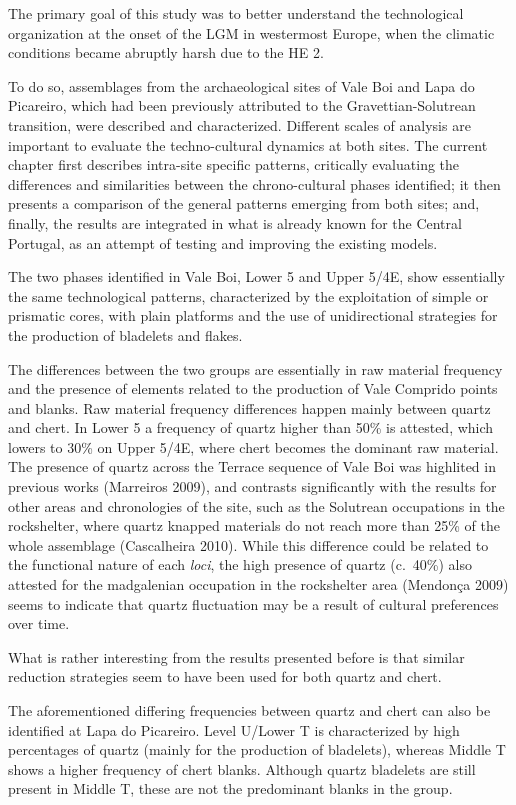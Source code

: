 \documentclass[12pt,twoside]{reedthesis}
\begin{document}
The primary goal of this study was to better understand the technological organization at the onset of the LGM in westermost Europe, when the climatic conditions became abruptly harsh due to the HE 2.

To do so, assemblages from the archaeological sites of Vale Boi and Lapa do Picareiro, which had been previously attributed to the Gravettian-Solutrean transition, were described and characterized. Different scales of analysis are important to evaluate the techno-cultural dynamics at both sites. The current chapter first describes intra-site specific patterns, critically evaluating the differences and similarities between the chrono-cultural phases identified; it then presents a comparison of the general patterns emerging from both sites; and, finally, the results are integrated in what is already known for the Central Portugal, as an attempt of testing and improving the existing models.

The two phases identified in Vale Boi, Lower 5 and Upper 5/4E, show essentially the same technological patterns, characterized by the exploitation of simple or prismatic cores, with plain platforms and the use of unidirectional strategies for the production of bladelets and flakes.

The differences between the two groups are essentially in raw material frequency and the presence of elements related to the production of Vale Comprido points and blanks. Raw material frequency differences happen mainly between quartz and chert. In Lower 5 a frequency of quartz higher than 50\% is attested, which lowers to 30\% on Upper 5/4E, where chert becomes the dominant raw material. The presence of quartz across the Terrace sequence of Vale Boi was highlited in previous works (Marreiros 2009), and contrasts significantly with the results for other areas and chronologies of the site, such as the Solutrean occupations in the rockshelter, where quartz knapped materials do not reach more than 25\% of the whole assemblage (Cascalheira 2010). While this difference could be related to the functional nature of each \emph{loci}, the high presence of quartz (c.~40\%) also attested for the madgalenian occupation in the rockshelter area (Mendonça 2009) seems to indicate that quartz fluctuation may be a result of cultural preferences over time.

What is rather interesting from the results presented before is that similar reduction strategies seem to have been used for both quartz and chert.

The aforementioned differing frequencies between quartz and chert can also be identified at Lapa do Picareiro. Level U/Lower T is characterized by high percentages of quartz (mainly for the production of bladelets), whereas Middle T shows a higher frequency of chert blanks. Although quartz bladelets are still present in Middle T, these are not the predominant blanks in the group.
\end{document}
